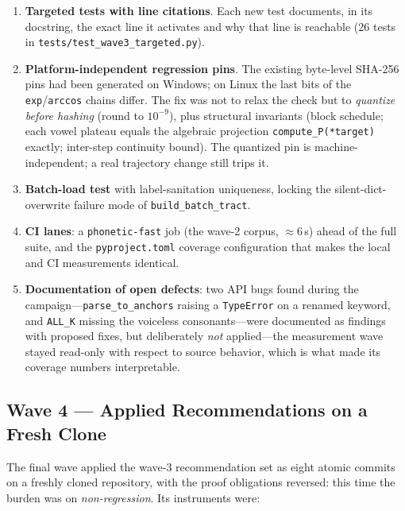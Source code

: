 \documentclass[11pt,a4paper]{article}
\newcommand{\code}[1]{\texttt{#1}}
\begin{document}
\begin{enumerate}[leftmargin=1.6em, itemsep=0.2em]
  \item \textbf{Targeted tests with line citations}. Each new test
        documents, in its docstring, the exact line it activates and
        why that line is reachable (26 tests in
        \code{tests/test\_wave3\_targeted.py}).
  \item \textbf{Platform-independent regression pins}. The existing
        byte-level SHA-256 pins had been generated on Windows; on
        Linux the last bits of the \code{exp}/\code{arccos} chains
        differ. The fix was not to relax the check but to
        \emph{quantize before hashing} (round to $10^{-9}$), plus
        structural invariants (block schedule; each vowel plateau
        equals the algebraic projection \code{compute\_P(*target)}
        exactly; inter-step continuity bound). The quantized pin is
        machine-independent; a real trajectory change still trips it.
  \item \textbf{Batch-load test} with label-sanitation uniqueness,
        locking the silent-dict-overwrite failure mode of
        \code{build\_batch\_tract}.
  \item \textbf{CI lanes}: a \code{phonetic-fast} job (the wave-2
        corpus, $\approx$6\,s) ahead of the full suite, and the
        \code{pyproject.toml} coverage configuration that makes the
        local and CI measurements identical.
  \item \textbf{Documentation of open defects}: two API bugs
        found during the campaign---\code{parse\_to\_anchors}
        raising a \code{TypeError} on a renamed keyword, and
        \code{ALL\_K} missing the voiceless consonants---were
        documented as
        findings with proposed fixes, but deliberately \emph{not}
        applied---the measurement wave stayed read-only with
        respect to source behavior, which is what made its
        coverage numbers interpretable.
\end{enumerate}

\subsection{Wave 4 --- Applied Recommendations on a Fresh Clone}
\label{sec:wave4}

The final wave applied the wave-3 recommendation set as eight atomic
commits on a freshly cloned repository, with the proof obligations
reversed: this time the burden was on \emph{non-regression}. Its
instruments were:
\end{document}
